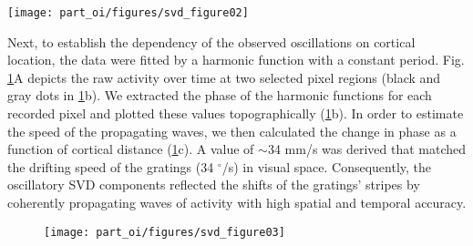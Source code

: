 \begin{sidewaysfigure} 
\centerline{
\texttt{[image: part\_oi/figures/svd\_figure02]} }
\caption[Propagation of Activity across Stationary Orientation Maps.]
{\protect}
\label{svd2}
\end{sidewaysfigure} 

Next, to establish the dependency of the observed oscillations on cortical
location, the data were fitted by a harmonic function with a constant
period. Fig. \ref{svd3}A depicts the raw activity over time at two selected
pixel regions (black and gray dots in \ref{svd3}b). We extracted the phase
of the harmonic functions for each recorded pixel and plotted these values
topographically (\ref{svd3}b). In order to estimate the speed of the
propagating waves, we then calculated the change in phase as a function of
cortical distance (\ref{svd3}c). A value of $\sim$34 mm/s was derived that
matched the drifting speed of the gratings (34 $^{\circ}$/s) in visual
space. Consequently, the oscillatory SVD components reflected the shifts of
the gratings' stripes by coherently propagating waves of activity with high
spatial and temporal accuracy.


\begin{figure}[!htb] 
\centerline{
\texttt{[image: part\_oi/figures/svd\_figure03]}
} \caption[Propagation Speed of Cortical Activity.] {
\protect} \label{svd3}\end{figure} 



